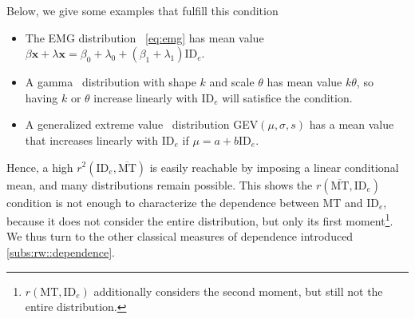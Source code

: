\documentclass[manuscript,review,anonymous]{acmart}
\newcommand{\mmt}{\ensuremath{\overline{\text{MT}}}\xspace}
\newcommand{\ide}{\ensuremath{{\text{ID}_e}}\xspace}
\begin{document}
Below, we give some examples that fulfill this condition
\begin{itemize}
	\item The EMG distribution~\cite{gori2018these,gori2019, li2024,zhao2022} \autoref{eq:emg} has mean value $\beta \mathbf{x} +  \lambda \mathbf{x} = \beta_0 + \lambda_0 + (\beta_1 + \lambda_1) \ide $.
	\item A gamma~\cite{jude2016} distribution with shape $k$ and scale $\theta$ has mean value $k\theta$, so having $k$ or $\theta$ increase linearly with \ide will satisfice the condition.
	\item A generalized extreme value~\cite{chapuis2007} distribution GEV$(\mu, \sigma, s)$ has a mean value that increases linearly with \ide if $\mu = a + b \ide$.
\end{itemize}
Hence, a high $r^2(\ide, \mmt)$ is easily reachable by imposing a linear conditional mean, and many distributions remain possible.
This shows the $r(\mmt, \ide)$ condition is not enough to characterize the dependence between MT and \ide, because it does not consider the entire distribution, but only its first moment\footnote{$r(\text{MT}, \ide)$ additionally considers the second moment, but still not the entire distribution.}. We thus turn to the other classical measures of dependence introduced \autoref{subs:rw::dependence}.



\end{document}
